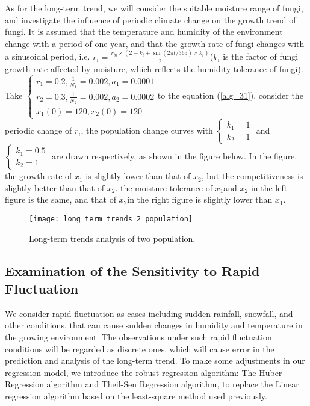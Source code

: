 \documentclass{mcmthesis}
\begin{document}
As for the long-term trend, we will consider the suitable moisture range of fungi, and investigate the influence of periodic climate change on the growth trend of fungi. It is assumed that the temperature and humidity of the environment change with a period of one year, and that the growth rate of fungi changes with a sinusoidal period, i.e. $ r_i = \frac {r_{i0} \times (2-k_i + \sin(2\pi t/365)\times k_i ) }{2} $($ k_i $ is the factor of fungi growth rate affected by moisture, which reflects the humidity tolerance of fungi). Take $ \left\{\begin{array}{l}
    r_{1}=0.2, \frac{1}{N_{1}}=0.002, a_{1}=0.0001 \\
    r_{2}=0.3, \frac{1}{N_{2}}=0.002, a_{2}=0.0002 \\
    x_{1}(0)=120, x_{2}(0)=120
    \end{array}\right. $to the equation (\ref{alg_31}), consider the periodic change of $ r_i $,  the population change curves with $ \left\{\begin{array}{l}
    k_{1}=1 \\
    k_{2}=1
    \end{array}\right. $ and $ \left\{\begin{array}{l}
    k_{1}=0.5 \\
    k_{2}=1
    \end{array}\right. $ are drawn respectively, as shown in the figure below. In the figure, the growth rate of $ x_1 $ is slightly lower than that of $ x_2 $, but the competitiveness is slightly better than that of $ x_2 $. the moisture tolerance of $ x_1 $and $ x_2 $ in the left figure is the same, and that of $ x_2 $in the right figure is slightly lower than $ x_1 $.

\begin{figure}[H]
  \small
  \centering
  \texttt{[image: long\_term\_trends\_2\_population]}
  \caption{Long-term trends analysis of two population.}
  \label{long_term_trends_2_population}
\end{figure}

\subsection{Examination of the Sensitivity to Rapid Fluctuation}

We consider rapid fluctuation as cases including sudden rainfall, snowfall, and other conditions, that can cause sudden changes in humidity and temperature in the growing environment. The observations under such rapid fluctuation conditions will be regarded as discrete ones, which will cause error in the prediction and analysis of the long-term trend. To make some adjustments  in our regression model, we introduce the robust regression algorithm: The Huber Regression algorithm and Theil-Sen Regression algorithm, to replace the Linear regression algorithm based on the least-square method used previously.
\end{document}
